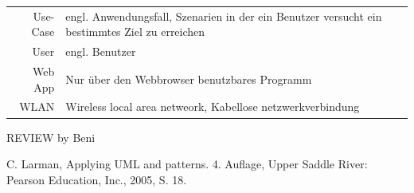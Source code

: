 \documentclass[ngerman,]{article}
\begin{document}
\begin{longtable}[]{@{}rl@{}}
\begin{minipage}[t]{0.18\columnwidth}\raggedleft\strut
Use-Case\strut
\end{minipage} & \begin{minipage}[t]{0.76\columnwidth}\raggedright\strut
engl. Anwendungsfall, Szenarien in der ein Benutzer versucht ein
bestimmtes Ziel zu erreichen\strut
\end{minipage}\tabularnewline
\begin{minipage}[t]{0.18\columnwidth}\raggedleft\strut
User\strut
\end{minipage} & \begin{minipage}[t]{0.76\columnwidth}\raggedright\strut
engl. Benutzer\strut
\end{minipage}\tabularnewline
\begin{minipage}[t]{0.18\columnwidth}\raggedleft\strut
Web App\strut
\end{minipage} & \begin{minipage}[t]{0.76\columnwidth}\raggedright\strut
Nur über den Webbrowser benutzbares Programm\strut
\end{minipage}\tabularnewline
\begin{minipage}[t]{0.18\columnwidth}\raggedleft\strut
WLAN\strut
\end{minipage} & \begin{minipage}[t]{0.76\columnwidth}\raggedright\strut
Wireless local area netweork, Kabellose netzwerkverbindung\strut
\end{minipage}\tabularnewline
\bottomrule
\end{longtable}

REVIEW by Beni

\begin{thebibliography}{9}
C. Larman, Applying UML and patterns. 4. Auflage, Upper Saddle River: Pearson Education, Inc., 2005, S. 18.
\end{thebibliography}
\end{document}
